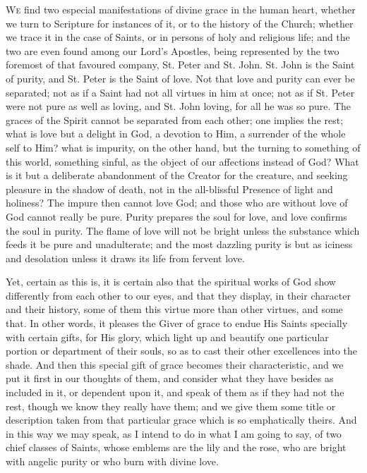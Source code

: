 
W\textsc{e} find two especial manifestations of divine grace in the human
heart, whether we turn to Scripture for instances of it, or to the
history of the Church; whether we trace it in the case of Saints, or
in persons of holy and religious life; and the two are even found
among our Lord's Apostles, being represented by the two foremost of
that favoured company, St. Peter and St. John. St. John is the Saint of
purity, and St. Peter is the Saint of love. Not that love and purity
can ever be separated; not as if a Saint had not all virtues in him at
once; not as if St. Peter were not pure as well as loving, and St.
John loving, for all he was so pure. The graces of the Spirit cannot
be separated from each other; one implies the rest; what is love but a
delight in God, a devotion to Him, a surrender of the whole self to
Him? what is impurity, on the other hand, but the turning to something
of this world, something sinful, as the object of our affections
instead of God? What is it but a deliberate abandonment of the Creator
for the creature, and seeking pleasure in the shadow of death, not in
the all-blissful Presence of light and holiness? The impure then
cannot love God; and those who are without love of God cannot really
be pure. Purity prepares the soul for love, and love confirms the soul
in purity. The flame of love will not be bright unless the substance
which feeds it be pure and unadulterate; and the most dazzling purity
is but as iciness and desolation unless it draws its life from fervent
love.

Yet, certain as this is, it is certain also that the spiritual
works of God show differently from each other to our eyes, and that
they display, in their character and their history, some of them this
virtue more than other virtues, and some that. In other words, it
pleases the Giver of grace to endue His Saints specially with certain
gifts, for His glory, which light up and beautify one particular
portion or department of their souls, so as to cast their other
excellences into the shade. And then this special gift of grace
becomes their characteristic, and we put it first in our thoughts of
them, and consider what they have besides as included in it, or
dependent upon it, and speak of them as if they had not the rest,
though we know they really have them; and we give them some title or
description taken from that particular grace which is so emphatically
theirs. And in this way we may speak, as I intend to do in what I am
going to say, of two chief classes of Saints, whose emblems are the
lily and the rose, who are bright with angelic purity or who burn with
divine love.

